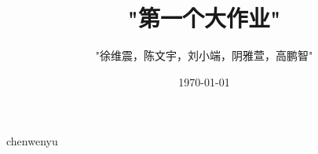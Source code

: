 \documentclass{article}
\begin{document}
	\title{"第一个大作业"}
	\author{"徐维震，陈文宇，刘小端，阴雅萱，高鹏智"}
	\date{\today}
	chenwenyu 
\end{document}
